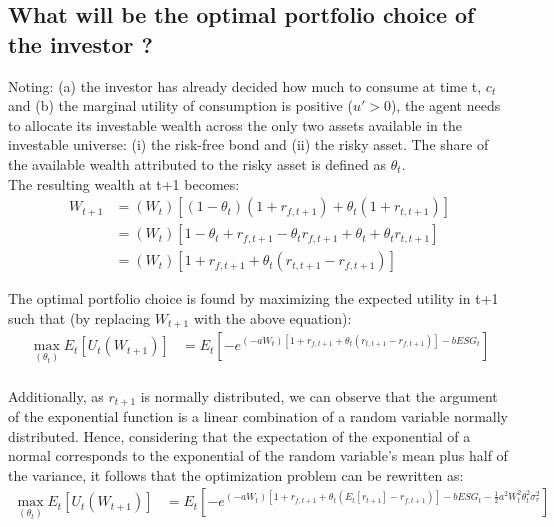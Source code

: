 \documentclass[12pt]{article}
\begin{document}
	\subsection{What will be the optimal portfolio choice of the investor ?}
	\setlength{\parindent}{0pt} Noting: (a) the investor has already decided how much to consume at time t, $c_t$ and (b) the marginal utility of consumption is positive ($u'>0$), the agent needs to allocate its investable wealth across the only two assets available in the investable universe: (i) the risk-free bond and (ii) the risky asset. The share of the available wealth attributed to the risky asset is defined as $\theta_t$. \\
	The resulting wealth at t+1 becomes: 
	\begin{align*}
		W_{t+1} &= (W_t)\left[(1-\theta_t)(1+r_{f, t+1})+ \theta_t(1+r_{t,t+1}) \right]\\
		&= (W_t) \left[1 -\theta_t + r_{f,t+1} - \theta_t r_{f,t+1} + \theta_t + \theta_t r_{t,t+1}\right]\\
		&= (W_t) \left[1 + r_{f,t+1} + \theta_t(r_{t,t+1}-r_{f, t+1}) \right]
	\end{align*} \vspace{-1.5em}
	
	\setlength{\parindent}{0pt} The optimal portfolio choice is found by maximizing the expected utility in t+1 such that (by replacing $W_{t+1}$ with the above equation):
	\begin{align*}
		\max_{(\theta_t)} E_t[U_{t}(W_{t+1})] &= E_t[-e^{(-aW_t) [1 + r_{f,t+1} + \theta_t(r_{t,t+1}-r_{f, t+1})] - bESG_t}] \\
	\end{align*}\vspace{-3.5em}
	
	Additionally, as $r_{t+1}$ is normally distributed, we can observe that the argument of the exponential function is a linear combination of a random variable normally distributed. Hence, considering that the expectation of the exponential of a normal corresponds to the exponential of the random variable's mean plus half of the variance, it follows that the optimization problem can be rewritten as: \vspace{-3em}\\
	
	\begin{align*}
		\max_{(\theta_t)} E_t[U_{t}(W_{t+1})] &= E_t[-e^{(-aW_t) [1 + r_{f,t+1} + \theta_t(E_{t}[r_{t+1}]-r_{f, t+1})] - bESG_t - \frac{1}{2}a^2W_t^2\theta_t^2\sigma_r^2}] \\
	\end{align*} \vspace{-3.25em}
	
\end{document}
